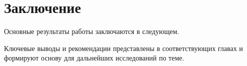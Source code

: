 \chapter*{Заключение}                       %


Основные результаты работы заключаются в следующем.

Ключевые выводы и рекомендации представлены в соответствующих главах и
формируют основу для дальнейших исследований по теме.
